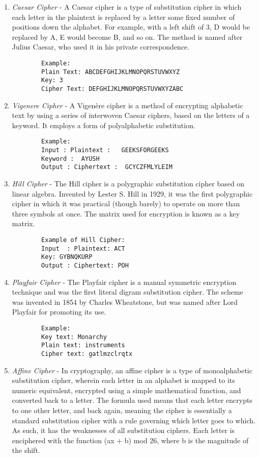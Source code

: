\documentclass[11pt]{article}
\begin{document}
\begin{enumerate}
	\item \textit{Caesar Cipher} - A Caesar cipher is a type of substitution cipher in which each letter in the plaintext is replaced by a letter some fixed number of positions down the alphabet. For example, with a left shift of 3, D would be replaced by A, E would become B, and so on. The method is named after Julius Caesar, who used it in his private correspondence.

	      \begin{verbatim}
		Example:
		Plain Text: ABCDEFGHIJKLMNOPQRSTUVWXYZ
		Key: 3
		Cipher Text: DEFGHIJKLMNOPQRSTUVWXYZABC
	\end{verbatim}
	\item \textit{Vigenere Cipher} - A Vigenère cipher is a method of encrypting alphabetic text by using a series of interwoven Caesar ciphers, based on the letters of a keyword. It employs a form of polyalphabetic substitution.

	      \begin{verbatim}
		Example:
		Input : Plaintext :   GEEKSFORGEEKS
		Keyword :  AYUSH
		Output : Ciphertext :  GCYCZFMLYLEIM
	\end{verbatim}

	\item \textit{Hill Cipher} - The Hill cipher is a polygraphic substitution cipher based on linear algebra. Invented by Lester S. Hill in 1929, it was the first polygraphic cipher in which it was practical (though barely) to operate on more than three symbols at once. The matrix used for encryption is known as a key matrix.
	      \begin{verbatim}
		Example of Hill Cipher:
		Input  : Plaintext: ACT
		Key: GYBNQKURP
		Output : Ciphertext: POH

	\end{verbatim}
	\item \textit{Playfair Cipher} - The Playfair cipher is a manual symmetric encryption technique and was the first literal digram substitution cipher. The scheme was invented in 1854 by Charles Wheatstone, but was named after Lord Playfair for promoting its use.

	      \begin{verbatim}
		Example:
		Key text: Monarchy
		Plain text: instruments
		Cipher text: gatlmzclrqtx
	\end{verbatim}


	\item \textit{Affine Cipher} - In cryptography, an affine cipher is a type of monoalphabetic substitution cipher, wherein each letter in an alphabet is mapped to its numeric equivalent, encrypted using a simple mathematical function, and converted back to a letter. The formula used means that each letter encrypts to one other letter, and back again, meaning the cipher is essentially a standard substitution cipher with a rule governing which letter goes to which. As such, it has the weaknesses of all substitution ciphers. Each letter is enciphered with the function (ax + b) mod 26, where b is the magnitude of the shift.


\end{enumerate}
\end{document}
